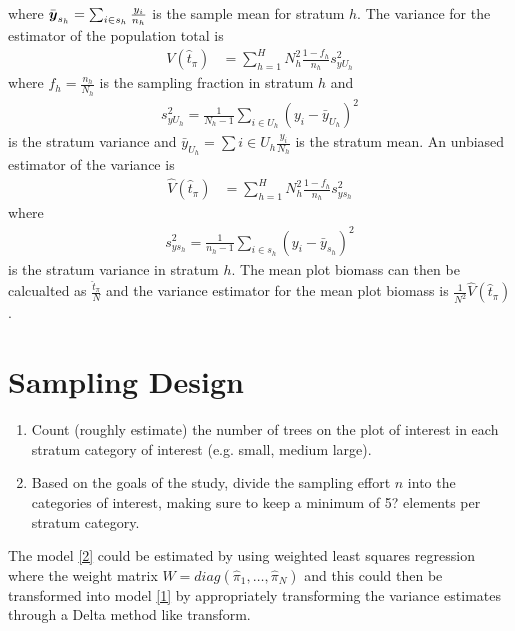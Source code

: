 \documentclass[fleqn]{article}
\def\bm#1{\mbox{\boldmath $#1$}}
\begin{document}
where $\bar{\bm{y}}_{s_h} = \sum_{i \in s_h} \frac{y_i} {n_h}$ is the sample mean for stratum $h$. The variance for the estimator of the population total is 
  \begin{align*}
    V(\hat{t}_\pi) & = \sum_{h = 1}^H N_h^2 \frac{1 - f_h} {n_h} s^2_{y U_h}
  \end{align*}
where $f_h = \frac{n_h} {N_h}$ is the sampling fraction in stratum $h$ and 
  \begin{align*}
    s^2_{y U_h} = \frac{1} {N_h - 1} \sum_{i \in U_h} (y_i - \bar{y}_{U_h})^2    
  \end{align*}
is the stratum variance and $\bar{y}_{U_h} = \sum{i \in U_h} \frac{y_i} {N_h}$ is the stratum mean. An unbiased estimator of the variance is 
  \begin{align*}
    \hat{V}(\hat{t}_\pi) & = \sum_{h = 1}^H N_h^2 \frac{1 - f_h} {n_h} s^2_{y s_h}
  \end{align*}
where
  \begin{align*}
    s^2_{y s_h} = \frac{1} {n_h - 1} \sum_{i \in s_h} (y_i - \bar{y}_{s_h})^2
  \end{align*}
is the stratum variance in stratum $h$. The mean plot biomass can then be calcualted as $\frac{\hat{t}_\pi} {N}$ and the variance estimator for the mean plot biomass is $\frac{1} {N^2} \hat{V}(\hat{t}_\pi)$.

%
\section{Sampling Design}
  \begin{enumerate}
    \item Count (roughly estimate) the number of trees on the plot of interest in each stratum category of interest (e.g. small, medium large). 
    \item Based on the goals of the study, divide the sampling effort $n$ into the categories of interest, making sure to keep a minimum of 5? elements per stratum category.
  \end{enumerate}
%
The model \eqref{2} could be estimated by using weighted least squares regression where the weight matrix $W = diag(\hat{\pi}_1, \ldots, \hat{\pi}_N)$ and this could then be transformed into model \eqref{1} by appropriately transforming the variance estimates through a Delta method like transform.\\
%
\end{document}
